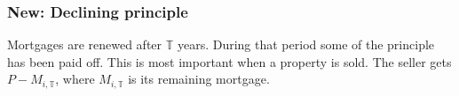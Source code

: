 {\subsubsection{New: Declining principle}\label{sec:declining-principle}

Mortgages are renewed after $\mathbb{T}$ years. During that period some of the principle has been paid off. This is most important when a property is sold. The seller gets $P-M_{i,\mathbb{T}}$, where  $M_{i,\mathbb{T}}$ is its remaining mortgage.






}
